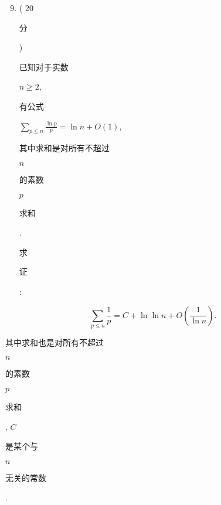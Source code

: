 \documentclass[10pt]{article}
\begin{document}
\begin{enumerate}
  \setcounter{enumi}{8}
  \item ( 20 \begin{CJK}{UTF8}{mj}分\end{CJK}) \begin{CJK}{UTF8}{mj}已知对于实数\end{CJK} $n \geqslant 2$, \begin{CJK}{UTF8}{mj}有公式\end{CJK} $\sum_{p \leqslant n} \frac{\ln p}{p}=\ln n+O(1)$, \begin{CJK}{UTF8}{mj}其中求和是对所有不超过\end{CJK} $n$ \begin{CJK}{UTF8}{mj}的素数\end{CJK} $p$ \begin{CJK}{UTF8}{mj}求和\end{CJK}. \begin{CJK}{UTF8}{mj}求\end{CJK} \begin{CJK}{UTF8}{mj}证\end{CJK}:
\end{enumerate}
$$
\sum_{p \leqslant n} \frac{1}{p}=C+\ln \ln n+O\left(\frac{1}{\ln n}\right) .
$$
\begin{CJK}{UTF8}{mj}其中求和也是对所有不超过\end{CJK} $n$ \begin{CJK}{UTF8}{mj}的素数\end{CJK} $p$ \begin{CJK}{UTF8}{mj}求和\end{CJK}, $C$ \begin{CJK}{UTF8}{mj}是某个与\end{CJK} $n$ \begin{CJK}{UTF8}{mj}无关的常数\end{CJK}.
\end{document}
